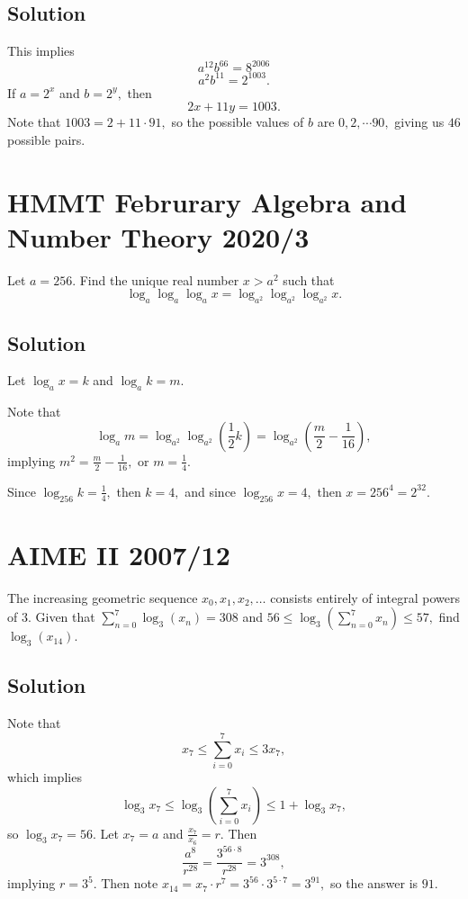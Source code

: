 \documentclass[blue,onecol]{shooting}
\begin{document}
\subsection{Solution}

This implies
\[a^{12}b^{66}=8^{2006}\]
\[a^2b^{11}=2^{1003}.\]
If $a=2^x$ and $b=2^y,$ then
\[2x+11y=1003.\]
Note that $1003=2+11\cdot 91,$ so the possible values of $b$ are $0,2,\cdots 90,$ giving us $46$ possible pairs.

\section{HMMT Februrary Algebra and Number Theory 2020/3}

Let $a=256$. Find the unique real number $x>a^2$ such that
\[\log_a \log_a \log_a x = \log_{a^2} \log_{a^2} \log_{a^2} x.\]

\subsection{Solution}

Let $\log_a{x}=k$ and $\log_{a}k=m.$

Note that \[\log_a{m}=\log_{a^2}\log_{a^2}(\frac{1}{2}k)=\log_{a^2}(\frac{m}{2}-\frac{1}{16}),\] implying $m^2=\frac{m}{2}-\frac{1}{16},$ or $m=\frac{1}{4}.$

Since $\log_{256}k=\frac{1}{4},$ then $k=4,$ and since $\log_{256}x=4,$ then $x=256^4=2^{32}.$

\section{AIME II 2007/12}

The increasing geometric sequence $x_{0},x_{1},x_{2},\ldots$ consists entirely of integral powers of $3.$ Given that $\sum_{n=0}^{7}\log_{3}(x_{n}) = 308$ and $56 \leq \log_{3}\left ( \sum_{n=0}^{7}x_{n}\right ) \leq 57,$ find $\log_{3}(x_{14}).$

\subsection{Solution}

Note that
    \[x_7\leq\sum\limits_{i=0}^{7}x_i \leq 3x_7,\]
    which implies
    \[\log_{3}x_7\leq\log_3(\sum\limits_{i=0}^{7}x_i)\leq 1+\log_{3}x_7,\]
    so $\log_{3}x_7=56.$
    Let $x_7=a$ and $\frac{x_7}{x_6}=r.$ Then
    \[\frac{a^8}{r^28}=\frac{3^{56\cdot 8}}{r^28}=3^{308},\]
    implying $r=3^5.$ Then note $x_14=x_7\cdot r^7=3^{56}\cdot 3^{5\cdot 7}=3^{91},$ so the answer is $91.$
\end{document}
